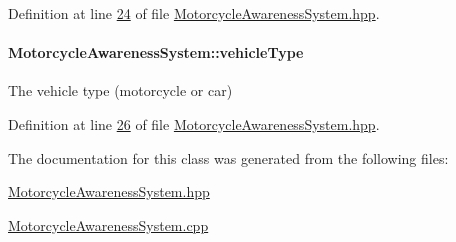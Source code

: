 Definition at line \hyperlink{MotorcycleAwarenessSystem_8hpp_source_l00024}{24} of file \hyperlink{MotorcycleAwarenessSystem_8hpp_source}{Motorcycle\-Awareness\-System.\-hpp}.

\hypertarget{classMotorcycleAwarenessSystem_a977b2085bfbf6a62902bf2d80160e6d2}{
\paragraph[{vehicle\-Type}]{ Motorcycle\-Awareness\-System\-::vehicle\-Type\hspace{0.3cm}{\ttfamily [private]}}}\label{classMotorcycleAwarenessSystem_a977b2085bfbf6a62902bf2d80160e6d2}


The vehicle type (motorcycle or car) 



Definition at line \hyperlink{MotorcycleAwarenessSystem_8hpp_source_l00026}{26} of file \hyperlink{MotorcycleAwarenessSystem_8hpp_source}{Motorcycle\-Awareness\-System.\-hpp}.



The documentation for this class was generated from the following files\-:\begin{DoxyCompactItemize}
\item 
\hyperlink{MotorcycleAwarenessSystem_8hpp}{Motorcycle\-Awareness\-System.\-hpp}\item 
\hyperlink{MotorcycleAwarenessSystem_8cpp}{Motorcycle\-Awareness\-System.\-cpp}\end{DoxyCompactItemize}
